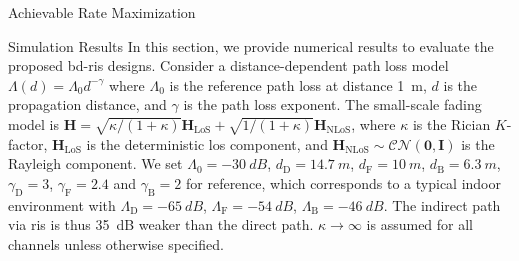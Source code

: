 \documentclass[journal]{IEEEtran}
\begin{document}
\begin{section}{Achievable Rate Maximization}


\end{section}

\begin{section}{Simulation Results}\label{sc:simulation}
	In this section, we provide numerical results to evaluate the proposed \gls{bd}-\gls{ris} designs.
	Consider a distance-dependent path loss model $\Lambda(d) = \Lambda_0 d^{-\gamma}$ where $\Lambda_0$ is the reference path loss at distance \qty{1}{m}, $d$ is the propagation distance, and $\gamma$ is the path loss exponent.
	The small-scale fading model is $\mathbf{H} = \sqrt{\kappa/(1+\kappa)} \mathbf{H}_\text{LoS} + \sqrt{1/(1+\kappa)} \mathbf{H}_\text{NLoS}$, where $\kappa$ is the Rician $K$-factor, $\mathbf{H}_\text{LoS}$ is the deterministic \gls{los} component, and $\mathbf{H}_\text{NLoS} \sim \mathcal{CN}(\mathbf{0}, \mathbf{I})$ is the Rayleigh component.
	We set $\Lambda_0=\qty{-30}{dB}$, $d_\mathrm{D}=\qty{14.7}{m}$, $d_\mathrm{F}=\qty{10}{m}$, $d_\mathrm{B}=\qty{6.3}{m}$, $\gamma_\mathrm{D}=3$, $\gamma_\mathrm{F}=2.4$ and $\gamma_\mathrm{B}=2$ for reference, which corresponds to a typical indoor environment with $\Lambda_\mathrm{D}=\qty{-65}{dB}$, $\Lambda_\mathrm{F}=\qty{-54}{dB}$, $\Lambda_\mathrm{B}=\qty{-46}{dB}$.
	The indirect path via \gls{ris} is thus \qty{35}{\dB} weaker than the direct path.
	$\kappa \to \infty$ is assumed for all channels unless otherwise specified.


\end{section}
\end{document}
